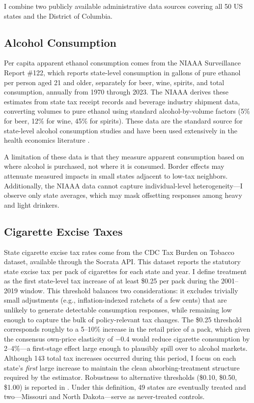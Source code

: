 \documentclass[12pt]{article}
\begin{document}
I combine two publicly available administrative data sources covering all 50 US states and the District of Columbia.

\subsection{Alcohol Consumption}

Per capita apparent ethanol consumption comes from the NIAAA Surveillance Report \#122, which reports state-level consumption in gallons of pure ethanol per person aged 21 and older, separately for beer, wine, spirits, and total consumption, annually from 1970 through 2023. The NIAAA derives these estimates from state tax receipt records and beverage industry shipment data, converting volumes to pure ethanol using standard alcohol-by-volume factors (5\% for beer, 12\% for wine, 45\% for spirits). These data are the standard source for state-level alcohol consumption studies and have been used extensively in the health economics literature \citep{cook2014paying}.

A limitation of these data is that they measure apparent consumption based on where alcohol is purchased, not where it is consumed. Border effects may attenuate measured impacts in small states adjacent to low-tax neighbors. Additionally, the NIAAA data cannot capture individual-level heterogeneity---I observe only state averages, which may mask offsetting responses among heavy and light drinkers.

\subsection{Cigarette Excise Taxes}

State cigarette excise tax rates come from the CDC Tax Burden on Tobacco dataset, available through the Socrata API. This dataset reports the statutory state excise tax per pack of cigarettes for each state and year. I define treatment as the first state-level tax increase of at least \$0.25 per pack during the 2001--2019 window. This threshold balances two considerations: it excludes trivially small adjustments (e.g., inflation-indexed ratchets of a few cents) that are unlikely to generate detectable consumption responses, while remaining low enough to capture the bulk of policy-relevant tax changes. The \$0.25 threshold corresponds roughly to a 5--10\% increase in the retail price of a pack, which given the consensus own-price elasticity of $-0.4$ \citep{chaloupka2002economics} would reduce cigarette consumption by 2--4\%---a first-stage effect large enough to plausibly spill over to alcohol markets. Although 143 total tax increases occurred during this period, I focus on each state's \textit{first} large increase to maintain the clean absorbing-treatment structure required by the \citet{callaway2021difference} estimator. Robustness to alternative thresholds (\$0.10, \$0.50, \$1.00) is reported in . Under this definition, 49 states are eventually treated and two---Missouri and North Dakota---serve as never-treated controls.
\end{document}
